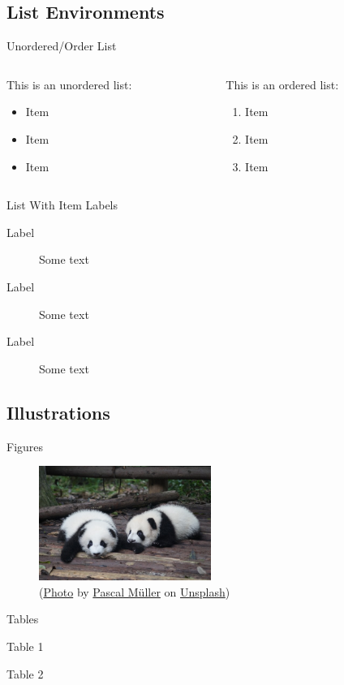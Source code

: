 \subsection{List Environments}

\begin{frame}{Unordered/Order List}
	\begin{columns}
		\begin{column}{0.5\textwidth}
			This is an unordered list:
			\begin{itemize}
				\item Item
				\item Item
				\item Item
			\end{itemize}
		\end{column}

		\begin{column}{0.5\textwidth}
			This is an ordered list:
			\begin{enumerate}
				\item Item
				\item Item
				\item Item
			\end{enumerate}
		\end{column}
	\end{columns}
\end{frame}

\begin{frame}{List With Item Labels}
	\begin{description}
		\item[Label] Some text
		\item[Label] Some text
		\item[Label] Some text
	\end{description}
\end{frame}

\subsection{Illustrations}

\begin{frame}{Figures}
	\begin{figure}[ht]
		\includegraphics[width = 0.5\textwidth]{04-figures/panda-cubs.jpg}
		\caption{(\href{https://unsplash.com/photos/4EajIuUxgAQ}{Photo} by \href{https://unsplash.com/@millerthachiller}{Pascal M\"{u}ller} on \href{https://unsplash.com/}{Unsplash})}
	\end{figure}
\end{frame}

\begin{frame}{Tables}
	\begin{table}[ht]
		\centering
		
		\caption{Table 1}
	\end{table}

	\begin{table}[ht]
		\centering
		
		\caption{Table 2}
	\end{table}
\end{frame}